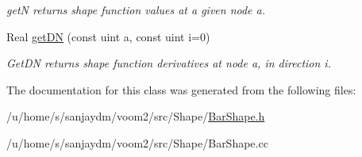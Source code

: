 \begin{DoxyCompactItemize}
\begin{DoxyCompactList}\small\item\em getN returns shape function values at a given node a. \item\end{DoxyCompactList}\item 
\hypertarget{classvoom_1_1_bar_shape_aa87f4b72df72d26ea0cb848543de1d53}{
Real \hyperlink{classvoom_1_1_bar_shape_aa87f4b72df72d26ea0cb848543de1d53}{getDN} (const uint a, const uint i=0)}
\label{classvoom_1_1_bar_shape_aa87f4b72df72d26ea0cb848543de1d53}

\begin{DoxyCompactList}\small\item\em GetDN returns shape function derivatives at node a, in direction i. \item\end{DoxyCompactList}\end{DoxyCompactItemize}


The documentation for this class was generated from the following files:\begin{DoxyCompactItemize}
\item 
/u/home/s/sanjaydm/voom2/src/Shape/\hyperlink{_bar_shape_8h}{BarShape.h}\item 
/u/home/s/sanjaydm/voom2/src/Shape/BarShape.cc\end{DoxyCompactItemize}
